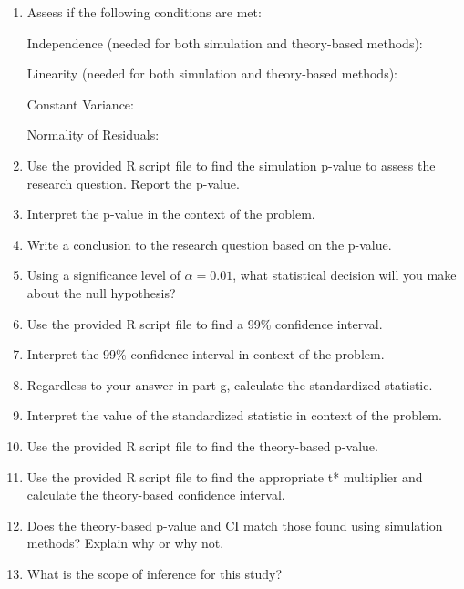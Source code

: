 \documentclass[
]{report}
\begin{document}
\begin{enumerate}
\def\labelenumi{\alph{enumi}.}
\setcounter{enumi}{5}
\item
  Assess if the following conditions are met:

  Independence (needed for both simulation and theory-based methods):
  \vspace{0.8in}

  Linearity (needed for both simulation and theory-based methods):
  \vspace{0.8in}

  Constant Variance:
  \vspace{0.8in}

  Normality of Residuals:
  \vspace{0.8in}
\item
  Use the provided R script file to find the simulation p-value to assess the research question. Report the p-value.
  \vspace{0.3in}
\item
  Interpret the p-value in the context of the problem.
  \vspace{0.8in}
\item
  Write a conclusion to the research question based on the p-value.
  \vspace{0.8in}
\item
  Using a significance level of \(\alpha = 0.01\), what statistical decision will you make about the null hypothesis?
  \vspace{0.3in}
\item
  Use the provided R script file to find a 99\% confidence interval.
  \vspace{0.3in}
\item
  Interpret the 99\% confidence interval in context of the problem.
  \vspace{0.8in}
\item
  Regardless to your answer in part g, calculate the standardized statistic.
  \vspace{0.4in}
\item
  Interpret the value of the standardized statistic in context of the problem.
  \vspace{0.8in}
\item
  Use the provided R script file to find the theory-based p-value.
  \vspace{0.3in}
\item
  Use the provided R script file to find the appropriate t* multiplier and calculate the theory-based confidence interval.
  \vspace{0.5in}
\item
  Does the theory-based p-value and CI match those found using simulation methods? Explain why or why not.
  \vspace{0.8in}
\item
  What is the scope of inference for this study?
  \vspace{0.8in}
\end{enumerate}
\end{document}
